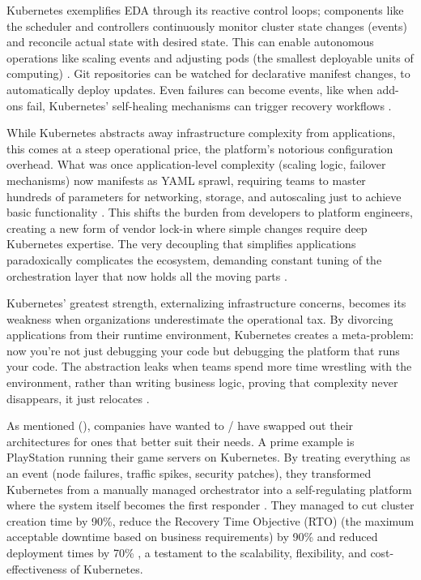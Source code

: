 \documentclass[]{final}
\begin{document}
Kubernetes exemplifies EDA through its reactive control loops; components like
the scheduler and controllers continuously monitor cluster state changes
(events) and reconcile actual state with desired state. This can enable
autonomous operations like scaling events and adjusting pods (the smallest
deployable units of computing) \cite{noauthor_fully_nodate}. Git repositories can be watched for declarative
manifest changes, to automatically deploy updates. Even failures can become
events, like when add-ons fail, Kubernetes' self-healing mechanisms
can trigger recovery workflows \cite{noauthor_fully_nodate}.

While Kubernetes abstracts away infrastructure complexity from applications,
this comes at a steep operational price, the platform's notorious configuration
overhead. What was once application-level complexity (scaling logic, failover
mechanisms) now manifests as YAML sprawl, requiring teams to master hundreds of
parameters for networking, storage, and autoscaling just to achieve basic
functionality \cite{noauthor_fully_nodate}. This shifts the burden from developers to platform engineers,
creating a new form of vendor lock-in where simple changes require deep
Kubernetes expertise. The very decoupling that simplifies applications
paradoxically complicates the ecosystem, demanding constant tuning of the
orchestration layer that now holds all the moving parts \cite{noauthor_fully_nodate}.

Kubernetes' greatest strength, externalizing infrastructure concerns, becomes
its weakness when organizations underestimate the operational tax. By
divorcing applications from their runtime environment, Kubernetes creates a
meta-problem: now you're not just debugging your code but debugging the
platform that runs your code. The abstraction leaks when teams spend more time
wrestling with the environment, rather than writing business logic, proving that
complexity never disappears, it just relocates \cite{noauthor_fully_nodate}.

As mentioned {\hypersetup{linkcolor=teal}(\pageref{rationale})}, companies have
wanted to / have swapped out their architectures
for ones that better suit their needs. A prime example is PlayStation running
their game servers on Kubernetes. By treating everything as an event (node failures, traffic spikes, security
patches), they transformed Kubernetes from a manually managed orchestrator
into a self-regulating platform where the system itself becomes the first
responder \cite{noauthor_fully_nodate}. They managed to cut cluster creation time by
90\%, reduce the Recovery Time Objective (RTO) (the maximum acceptable downtime
based on business requirements) by 90\% and reduced deployment times by 70\% \cite{noauthor_fully_nodate},
a testament to the scalability, flexibility, and cost-effectiveness of Kubernetes.
\end{document}
